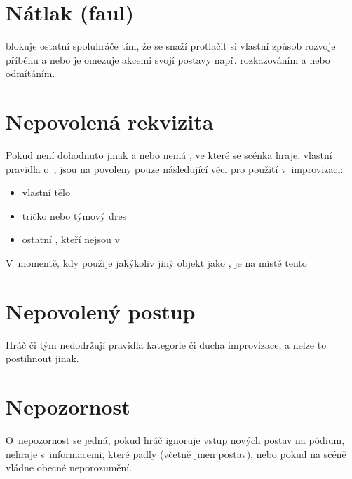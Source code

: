  
\needspace{5cm} \section{Nátlak (faul)} \label{nátlak (faul)}  
 blokuje ostatní spoluhráče tím, že se snaží protlačit si vlastní způsob rozvoje příběhu a nebo je omezuje akcemi svojí postavy např. rozkazováním a nebo odmítáním. 
 
 
\needspace{5cm} \section{Nepovolená rekvizita} \label{nepovolená rekvizita}  
 
Pokud není dohodnuto jinak a nebo nemá , ve které se scénka hraje, vlastní pravidla o~, jsou na  povoleny pouze následující věci pro použití v~improvizaci: 
 
\begin{itemize}
\item  vlastní tělo
\item  tričko nebo týmový dres
\item  ostatní , kteří nejsou v~
\end{itemize}
 
V~momentě, kdy  použije jakýkoliv jiný objekt jako , je na místě tento  
 
 
\needspace{5cm} \section{Nepovolený postup} \label{nepovolený postup}  
 
 
Hráč či tým nedodržují pravidla kategorie či ducha improvizace, a nelze to postihnout jinak. 
\needspace{5cm} \section{Nepozornost} \label{nepozornost}  
 
O~nepozornost se jedná, pokud hráč ignoruje vstup nových postav na pódium, 
nehraje s~informacemi, které padly (včetně jmen postav), nebo pokud na scéně  
vládne obecné neporozumění. 
 
